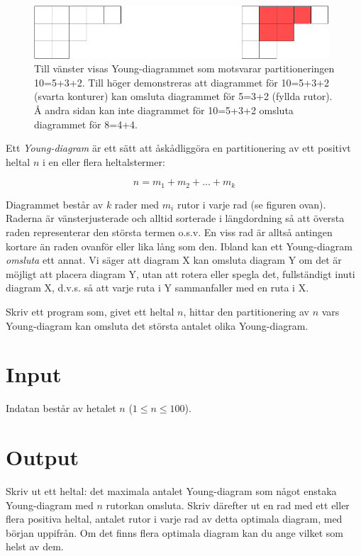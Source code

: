 
\begin{figure}[!h]
\includegraphics[width=0.98\textwidth]{young}
\caption{Till vänster visas Young-diagrammet som motsvarar partitioneringen 10=5+3+2. Till höger demonstreras att diagrammet för 10=5+3+2 (svarta konturer) kan omsluta diagrammet för 5=3+2 (fyllda rutor). Å andra sidan kan inte diagrammet för 10=5+3+2 omsluta diagrammet för 8=4+4.}
\end{figure}

Ett \emph{Young-diagram} är ett sätt att åskådliggöra en partitionering av ett positivt heltal $n$ i en eller flera heltalstermer:

$$n = m_1 + m_2 + ... + m_k$$

Diagrammet består av $k$ rader med $m_i$ rutor i varje rad (se figuren ovan). Raderna är vänsterjusterade och alltid sorterade i längdordning så att översta raden representerar den största termen o.s.v. En viss rad är alltså antingen kortare än raden ovanför eller lika lång som den. Ibland kan ett Young-diagram \emph{omsluta} ett annat. Vi säger att diagram X kan omsluta diagram Y om det är möjligt att placera diagram Y, utan att rotera eller spegla det, fullständigt inuti diagram X, d.v.s. så att varje ruta i Y sammanfaller med en ruta i X.

Skriv ett program som, givet ett heltal $n$, hittar den partitionering av $n$ vars Young-diagram kan omsluta det största antalet olika Young-diagram.

\section*{Input}
Indatan består av hetalet $n$ ($1 \le n \le 100$).

\section*{Output}
Skriv ut ett heltal: det maximala antalet Young-diagram som något enstaka Young-diagram med $n$ rutorkan omsluta.
Skriv därefter ut en rad med ett eller flera positiva heltal, antalet rutor i varje rad av detta optimala diagram,
med början uppifrån. Om det finns flera optimala diagram kan du ange vilket som helst av dem.

